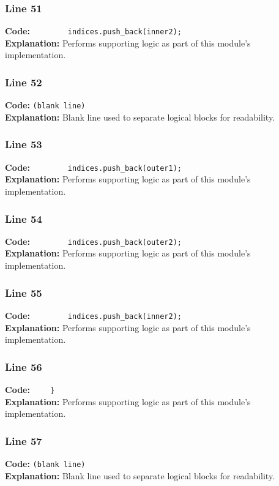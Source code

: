 \documentclass[11pt,a4paper]{article}
\begin{document}
\subsubsection*{Line 51}
\textbf{Code:} \verb|        indices.push_back(inner2);|\\
\textbf{Explanation:} Performs supporting logic as part of this module's implementation.

\subsubsection*{Line 52}
\textbf{Code:} \texttt{(blank line)}\\
\textbf{Explanation:} Blank line used to separate logical blocks for readability.

\subsubsection*{Line 53}
\textbf{Code:} \verb|        indices.push_back(outer1);|\\
\textbf{Explanation:} Performs supporting logic as part of this module's implementation.

\subsubsection*{Line 54}
\textbf{Code:} \verb|        indices.push_back(outer2);|\\
\textbf{Explanation:} Performs supporting logic as part of this module's implementation.

\subsubsection*{Line 55}
\textbf{Code:} \verb|        indices.push_back(inner2);|\\
\textbf{Explanation:} Performs supporting logic as part of this module's implementation.

\subsubsection*{Line 56}
\textbf{Code:} \verb|    }|\\
\textbf{Explanation:} Performs supporting logic as part of this module's implementation.

\subsubsection*{Line 57}
\textbf{Code:} \texttt{(blank line)}\\
\textbf{Explanation:} Blank line used to separate logical blocks for readability.
\end{document}
